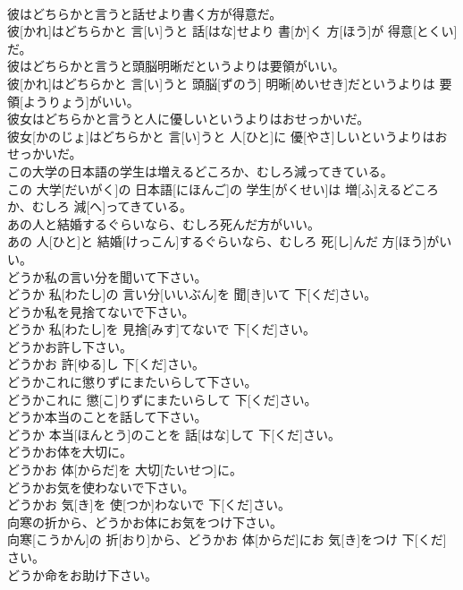 \documentclass[8pt]{extreport}
\begin{document}
\begin{CJK}{UTF8}{min}
\\	彼はどちらかと言うと話せより書く方が得意だ。	
\\	彼[かれ]はどちらかと 言[い]うと 話[はな]せより 書[か]く 方[ほう]が 得意[とくい]だ。
\\	彼はどちらかと言うと頭脳明晰だというよりは要領がいい。	
\\	彼[かれ]はどちらかと 言[い]うと 頭脳[ずのう] 明晰[めいせき]だというよりは 要領[ようりょう]がいい。
\\	彼女はどちらかと言うと人に優しいというよりはおせっかいだ。	
\\	彼女[かのじょ]はどちらかと 言[い]うと 人[ひと]に 優[やさ]しいというよりはおせっかいだ。
\\	この大学の日本語の学生は増えるどころか、むしろ減ってきている。	
\\	この 大学[だいがく]の 日本語[にほんご]の 学生[がくせい]は 増[ふ]えるどころか、むしろ 減[へ]ってきている。
\\	あの人と結婚するぐらいなら、むしろ死んだ方がいい。	
\\	あの 人[ひと]と 結婚[けっこん]するぐらいなら、むしろ 死[し]んだ 方[ほう]がいい。
\\	どうか私の言い分を聞いて下さい。	
\\	どうか 私[わたし]の 言い分[いいぶん]を 聞[き]いて 下[くだ]さい。
\\	どうか私を見捨てないで下さい。	
\\	どうか 私[わたし]を 見捨[みす]てないで 下[くだ]さい。
\\	どうかお許し下さい。	
\\	どうかお 許[ゆる]し 下[くだ]さい。
\\	どうかこれに懲りずにまたいらして下さい。	
\\	どうかこれに 懲[こ]りずにまたいらして 下[くだ]さい。
\\	どうか本当のことを話して下さい。	
\\	どうか 本当[ほんとう]のことを 話[はな]して 下[くだ]さい。
\\	どうかお体を大切に。	
\\	どうかお 体[からだ]を 大切[たいせつ]に。
\\	どうかお気を使わないで下さい。	
\\	どうかお 気[き]を 使[つか]わないで 下[くだ]さい。
\\	向寒の折から、どうかお体にお気をつけ下さい。	
\\	向寒[こうかん]の 折[おり]から、どうかお 体[からだ]にお 気[き]をつけ 下[くだ]さい。
\\	どうか命をお助け下さい。	

\end{CJK}
\end{document}
